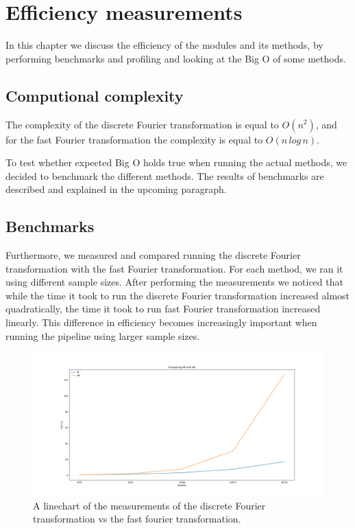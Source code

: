 \documentclass[a4paper,11pt]{report}
\begin{document}
    \section{Efficiency measurements}
    
    In this chapter we discuss the efficiency of the modules and its methods, by performing benchmarks and profiling and looking at the Big O of some methods.

    \subsection{Computional complexity}

    The complexity of the discrete Fourier transformation is equal to $O(n^2)$, and for the fast Fourier transformation the complexity is equal to $O(n\,log\,n)$.

    To test whether expected Big O holds true when running the actual methods, we decided to benchmark the different methods. The results of benchmarks are described
    and explained in the upcoming paragraph.

    \subsection{Benchmarks}
    
    Furthermore, we measured and compared running the discrete Fourier transformation with the fast Fourier transformation. For each method, we ran it using different sample sizes.
    After performing the measurements we noticed that while the time it took to run the discrete Fourier transformation increased almost quadratically, the time it took to run fast 
    Fourier transformation increased linearly. This difference in efficiency becomes increasingly important when running the pipeline using larger sample sizes.

    \begin{figure}[h]
        \hspace*{-2cm}                                                           
        \includegraphics[width=1.4\columnwidth]{linechart_dft_vs_fft}
        \caption{A linechart of the measurements of the discrete Fourier transformation vs the fast fourier transformation.}
    \end{figure}
\end{document}
